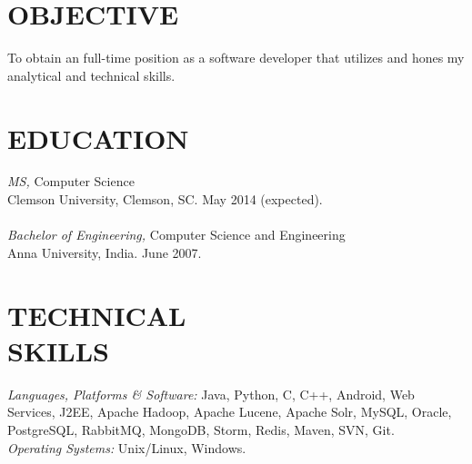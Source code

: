 \documentclass[line,margin]{res}
\begin{document}
\address{813 College Ave, Apt 23, Clemson, SC 29631}
\address{gyanasr@g.clemson.edu $\mid$ (864) 633-9988}

 
\begin{resume}
 
\section{OBJECTIVE}       To obtain an full-time position as a software developer that utilizes and hones my analytical and technical skills. 
 
\section{EDUCATION} 
				{\sl MS,} Computer Science \\
                Clemson University, Clemson, SC. 
                May 2014 (expected).\\\\
				{\sl Bachelor of Engineering,} Computer Science and Engineering \\
                Anna University, India.
                June 2007.
 
 
\section{TECHNICAL \\ SKILLS} {\sl Languages, Platforms \& Software:} Java, Python, C, C++, Android, Web Services, J2EE, Apache Hadoop, Apache Lucene, Apache Solr, MySQL, Oracle, PostgreSQL, RabbitMQ, MongoDB, Storm, Redis, Maven, SVN, Git. 
\\
                {\sl Operating Systems:}  Unix/Linux, Windows.
 

\end{resume}
\end{document}
